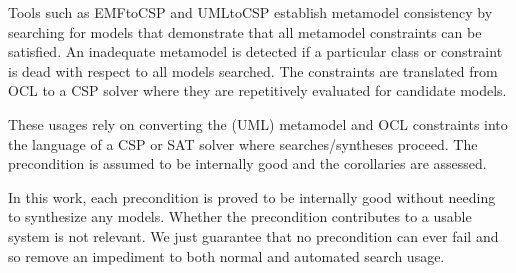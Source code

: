\documentclass[
]{ceurart}
\begin{document}
Tools such as EMFtoCSP \cite{EMFtoCSP} and UMLtoCSP establish metamodel consistency by searching for models that demonstrate that all metamodel constraints can be satisfied. An inadequate metamodel is detected if a particular class or constraint is dead with respect to all models searched. The constraints are translated from OCL to a CSP solver where they are repetitively evaluated for candidate models. 

These usages rely on converting the (UML) metamodel and OCL constraints into the language of a CSP or SAT solver where searches/syntheses proceed. The precondition is assumed to be internally good and the corollaries are assessed.

In this work, each precondition is proved to be internally good without needing to synthesize any models. Whether the precondition contributes to a usable system is not relevant. We just guarantee that no precondition can ever fail and so remove an impediment to both normal and automated search usage.






\end{document}
